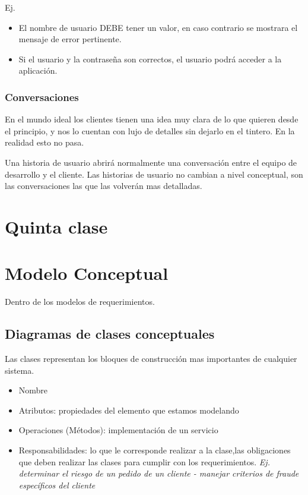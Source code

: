 \documentclass[titlepage,a4paper]{article}
\begin{document}
Ej.
\begin{itemize}
    \item El nombre de usuario DEBE tener un valor, en caso contrario se mostrara el mensaje de error pertinente.
    \item Si el usuario y la contraseña son correctos, el usuario podrá acceder a la aplicación.
\end{itemize}

\subsubsection*{Conversaciones}
En el mundo ideal los clientes tienen una idea muy clara de lo que quieren desde el principio, y nos lo cuentan con lujo de detalles sin dejarlo en el tintero. En la realidad esto no pasa.

Una historia de usuario abrirá normalmente una conversación entre el equipo de desarrollo y el cliente. Las historias de usuario no cambian a nivel conceptual, son las conversaciones las que las volverán mas detalladas.


\section*{Quinta clase}

\section{Modelo Conceptual}
Dentro de los modelos de requerimientos.

\subsection{Diagramas de clases conceptuales}
Las clases representan los bloques de construcción mas importantes de cualquier sistema.

\begin{itemize}
    \item Nombre
    \item Atributos: propiedades del elemento que estamos modelando
    \item Operaciones (Métodos): implementación de un servicio
    \item Responsabilidades: lo que le corresponde realizar a la clase,las obligaciones que deben realizar las clases para cumplir con los requerimientos. \textit{Ej. determinar el riesgo de un pedido de un cliente - manejar criterios de fraude específicos del cliente}
\end{itemize}
\end{document}
